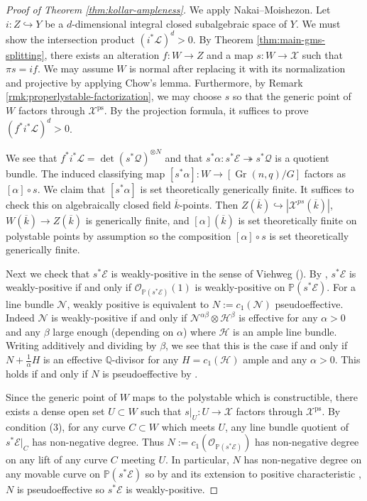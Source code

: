 \documentclass{amsart}
\theoremstyle{definition}
\newcommand{\bP}{\mathbb{P}}
\newcommand{\cX}{\mathcal{X}}
\newcommand{\cO}{\mathcal{O}}
\newcommand{\cE}{\mathcal{E}}
\newcommand{\cH}{\mathcal{H}}
\newcommand{\cL}{\mathcal{L}}
\newcommand{\cQ}{\mathcal{Q}}
\newcommand{\cN}{\mathcal{N}}
\DeclareMathOperator{\Gr}{Gr}
\DeclareMathOperator{\ps}{ps}
\begin{document}
	\begin{proof}[{Proof of Theorem \ref{thm:kollar-ampleness}}]
		We apply Nakai--Moishezon. Let $i\colon Z\hookrightarrow Y$ be a $d$-dimensional integral closed subalgebraic space of $Y$. We must show the intersection product $(i^*\cL)^d>0$. By Theorem \ref{thm:main-gms-splitting}, there exists an alteration $f\colon W\to Z$ and a map $s\colon W\to\cX$ such that $\pi s=if$. We may assume $W$ is normal after replacing it with its normalization and projective by applying Chow's lemma. Furthermore, by Remark \ref{rmk:properlystable-factorization}, we may choose $s$ so that the generic point of $W$ factors through $\cX^{\ps}$. By the projection formula, it suffices to prove $(f^*i^*\cL)^d>0$. 
		
		We see that $f^*i^*\cL=\det(s^*\cQ)^{\otimes N}$ and that $s^*\alpha\colon s^*\cE\twoheadrightarrow s^*\cQ$ is a quotient bundle. The induced classifying map $[s^*\alpha] \colon W \to [\Gr(n,q)/G]$ factors as $[\alpha] \circ s$. We claim that $[s^*\alpha]$ is set theoretically generically finite. It suffices to check this on algebraically closed field $\overline{k}$-points. Then $Z(\overline{k}) \hookrightarrow |\cX^{ps}(\overline{k})|$, $W(\overline{k}) \to Z(\overline{k})$ is generically finite, and $[\alpha](\overline{k})$ is set theoretically finite on polystable points by assumption so the composition $[\alpha] \circ s$ is set theoretically generically finite. 
		
		Next we check that $s^*\cE$ is weakly-positive in the sense of Viehweg (\cite[Definition 3.7]{KovacsPatakfalvi2017}). By \cite[\S 3.4(d)]{viehweg}, $s^*\cE$ is weakly-positive if and only if $\cO_{\bP(s^*\cE)}(1)$ is weakly-positive on $\bP(s^*\cE)$. For a line bundle $\cN$, weakly positive is equivalent to $N := c_1(\cN)$ pseudoeffective. Indeed $\cN$ is weakly-positive if and only if $\cN^{\alpha \beta}\otimes \cH^\beta$ is effective for any $\alpha > 0$ and any $\beta$ large enough (depending on $\alpha$) where $\cH$ is an ample line bundle. Writing additively and dividing by $\beta$, we see that this is the case if and only if $N + \frac{1}{\alpha}H$ is an effective $\mathbb{Q}$-divisor for any $H = c_1(\cH)$ ample and any $\alpha > 0$. This holds if and only if $N$ is pseudoeffective by \cite[Theorem 2.2.26]{positivity}. 
		
		Since the generic point of $W$ maps to the polystable which is constructible, there exists a dense open set $U \subset W$ such that $s|_U \colon U \to \cX$ factors through $\cX^{\ps}$. By condition (3), for any curve $C \subset W$ which meets $U$, any line bundle quotient of $s^*\cE|_C$ has non-negative degree. Thus $N:=c_1(\cO_{\bP(s^*\cE)})$ has non-negative degree on any lift of any curve $C$ meeting $U$. In particular, $N$ has non-negative degree on any movable curve on $\bP(s^*\cE)$ so by \cite[Theorem 0.2]{bdpp} and its extension to positive characteristic \cite[Theorem 2.22]{fulgerlehmann}, $N$ is pseudoeffective so $s^*\cE$ is weakly-positive. 
		

\end{proof}
\end{document}
